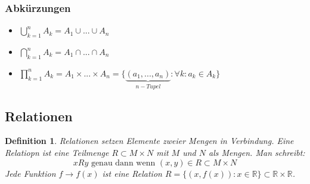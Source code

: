\documentclass[12pt,a4paper]{article}%
\newtheorem{definition}[satz]{Definition}
\numberwithin{equation}{section}
\newcommand{\R}{\mathbb{R}} %
\numberwithin{equation}{subsection}
\begin{document}
	  \subsubsection{Abkürzungen}
	  \begin{itemize}
	    \item $\bigcup\limits_{k = 1}^n A_k = A_1 \cup ... \cup A_n$
	    \item $\bigcap\limits_{k=1}^n A_k = A_1 \cap ... \cap A_n$
	    \item $\prod\limits_{k=1}^n A_k = A_1 \times ... \times A_n = \lbrace \underbrace{(a_1, ..., a_n)}_{n-Tupel}:\forall k: a_k \in A_k \rbrace$
	  \end{itemize}
	\subsection{Relationen}
	\begin{definition}
	  Relationen setzen Elemente zweier Mengen in Verbindung. Eine Relatiopn ist eine Teilmenge $R\subset M \times N$ mit $M$ und $N$ als Mengen. Man schreibt:
	  \begin{equation*}
	    xRy \text{ genau dann wenn } (x,y) \in R\subset M\times N
	  \end{equation*}
	  Jede Funktion $f \rightarrow f(x)$ ist eine Relation $R=\lbrace (x, f(x)): x\in \R \rbrace \subset \R \times \R$.
	\end{definition}
\end{document}
